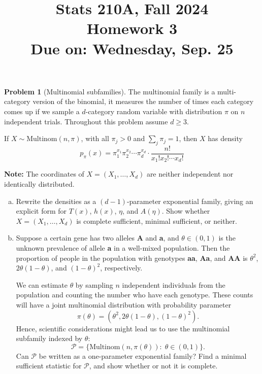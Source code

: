 \documentclass{article}
\newcommand{\cP}{\mathcal{P}}
\theoremstyle{definition}
\newtheorem{problem}{Problem}
\begin{document}
\title{Stats 210A, Fall 2024\\
  Homework 3 \\
  {\large {\bf Due on}: Wednesday, Sep. 25}}
\date{}

\maketitle

\begin{problem}[Multinomial subfamilies]

  The multinomial family is a multi-category version of the binomial, it measures the number of times each category comes up if we sample a $d$-category random variable with distribution $\pi$ on $n$ independent trials. Throughout this problem assume $d \geq 3$.

  If $X \sim \text{Multinom}(n, \pi)$, with all $\pi_j > 0$ and $\sum_j \pi_j = 1$, then $X$ has density
  \[
  p_\pi(x) = \pi_1^{x_1}\pi_2^{x_2}\cdots \pi_d^{x_d} \cdot \frac{n!}{x_1! x_2! \cdots x_d!}
  \]
  
  {\bf Note:} The coordinates of $X=(X_1,\ldots,X_d)$ are neither independent nor identically distributed.

 \begin{enumerate}[(a)]
    
  \item Rewrite the densities as a $(d-1)$-parameter exponential family, giving an explicit form for $T(x)$, $h(x)$, $\eta$, and $A(\eta)$. Show whether $X=(X_1,\ldots,X_d)$ is complete sufficient, minimal sufficient, or neither.

    
  
  \item Suppose a certain gene has two alleles {\bf A} and {\bf a}, and $\theta\in (0,1)$ is the unknown prevalence of allele {\bf a} in a well-mixed population. Then the proportion of people in the population with genotypes {\bf aa}, {\bf Aa}, and {\bf AA} is $\theta^2$, $2\theta(1-\theta)$, and $(1-\theta)^2$, respectively.

    We can estimate $\theta$ by sampling $n$ independent individuals from the population and counting the number who have each genotype. These counts will have a joint multinomial distribution with probability parameter
    \[
    \pi(\theta) = (\theta^2, 2\theta(1-\theta), (1-\theta)^2).
    \]
    Hence, scientific considerations might lead us to use the multinomial subfamily indexed by $\theta$:
    \[
    \cP = \{\text{Multinom}(n,\pi(\theta)):\; \theta \in (0,1)\}.
    \]
    Can $\cP$ be written as a one-parameter exponential family? Find a minimal sufficient statistic for $\cP$, and show whether or not it is complete.


\end{enumerate}
\end{problem}
\end{document}

